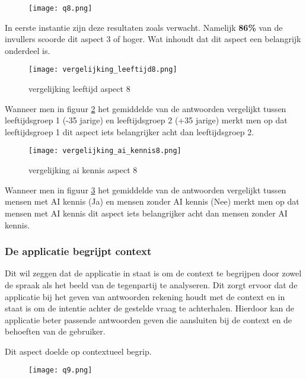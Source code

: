 \begin{figure}[htbp]
    \centering
    \texttt{[image: q8.png]}
    \label{fig:vraag_8_resultaat}
\end{figure}

In eerste instantie zijn deze resultaten zoals verwacht. Namelijk \textbf{86\%} van de invullers scoorde dit aspect 3 of hoger. Wat inhoudt dat dit aspect een belangrijk onderdeel is.

\begin{figure}[htbp]
    \centering
    \texttt{[image: vergelijking\_leeftijd8.png]}
    \caption{vergelijking leeftijd aspect 8}
    \label{fig:vergelijking_leeftijd8}
\end{figure}

Wanneer men in figuur \ref{fig:vergelijking_leeftijd8} het gemiddelde van de antwoorden vergelijkt tussen leeftijdsgroep 1 (-35 jarige) en leeftijdsgroep 2 (+35 jarige) merkt men op dat leeftijdsgroep 1 dit aspect iets belangrijker acht dan leeftijdsgroep 2.

\begin{figure}[htbp]
    \centering
    \texttt{[image: vergelijking\_ai\_kennis8.png]}
    \caption{vergelijking ai kennis aspect 8}
    \label{fig:vergelijking_ai_kennis8}
\end{figure}

Wanneer men in figuur \ref{fig:vergelijking_ai_kennis8} het gemiddelde van de antwoorden vergelijkt tussen mensen met AI kennis (Ja) en mensen zonder AI kennis (Nee) merkt men op dat mensen met AI kennis dit aspect iets belangrijker acht dan mensen zonder AI kennis.

\newpage

\subsubsection{De applicatie begrijpt context}

Dit wil zeggen dat de applicatie in staat is om de context te begrijpen door zowel de spraak als het beeld van de tegenpartij te analyseren. Dit zorgt ervoor dat de applicatie bij het geven van antwoorden rekening houdt met de context en in staat is om de intentie achter de gestelde vraag te achterhalen. Hierdoor kan de applicatie beter passende antwoorden geven die aansluiten bij de context en de behoeften van de gebruiker.

Dit aspect doelde op contextueel begrip.

\begin{figure}[htbp]
    \centering
    \texttt{[image: q9.png]}
    \label{fig:vraag_9_resultaat}
\end{figure}

